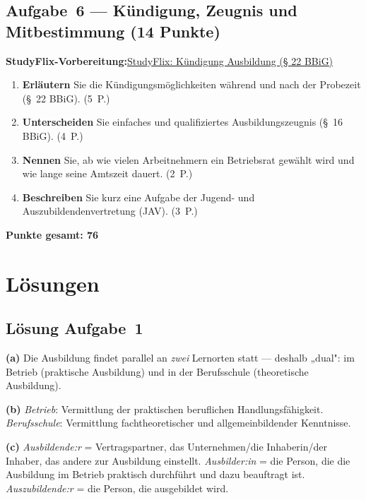 \documentclass[11pt, a4paper]{article}
\begin{document}
\subsection*{Aufgabe~6 --- Kündigung, Zeugnis und Mitbestimmung (14 Punkte)}

\noindent\textbf{\color{bfwAccent}StudyFlix-Vorbereitung:}\enspace \href{https://studyflix.de/ausbildung/karriere-ausbildung/kuendigung-ausbildung-4804}{StudyFlix: Kündigung Ausbildung (§ 22 BBiG)}

\begin{enumerate}[label=(\alph*)]
  \item \textbf{Erläutern} Sie die Kündigungsmöglichkeiten während und nach der Probezeit (\S~22 BBiG). \hfill (5~P.)
  \item \textbf{Unterscheiden} Sie einfaches und qualifiziertes Ausbildungszeugnis (\S~16 BBiG). \hfill (4~P.)
  \item \textbf{Nennen} Sie, ab wie vielen Arbeitnehmern ein Betriebsrat gewählt wird und wie lange seine Amtszeit dauert. \hfill (2~P.)
  \item \textbf{Beschreiben} Sie kurz eine Aufgabe der Jugend- und Auszubildendenvertretung (JAV). \hfill (3~P.)
\end{enumerate}

\vspace{1em}
\noindent\textbf{Punkte gesamt: 76}

\newpage

\section{Lösungen}\label{loesungen}

\subsection*{Lösung Aufgabe~1}
\begin{loesung}
\textbf{(a)} Die Ausbildung findet parallel an \emph{zwei} Lernorten statt --- deshalb
„dual": im Betrieb (praktische Ausbildung) und in der Berufsschule (theoretische
Ausbildung).

\textbf{(b)} \emph{Betrieb}: Vermittlung der praktischen beruflichen Handlungsfähigkeit.
\emph{Berufsschule}: Vermittlung fachtheoretischer und allgemeinbildender Kenntnisse.

\textbf{(c)} \emph{Ausbildende:r} = Vertragspartner, das Unternehmen/die Inhaberin/der
Inhaber, das andere zur Ausbildung einstellt. \emph{Ausbilder:in} = die Person, die die
Ausbildung im Betrieb praktisch durchführt und dazu beauftragt ist. \emph{Auszubildende:r}
= die Person, die ausgebildet wird.
\end{loesung}
\end{document}
